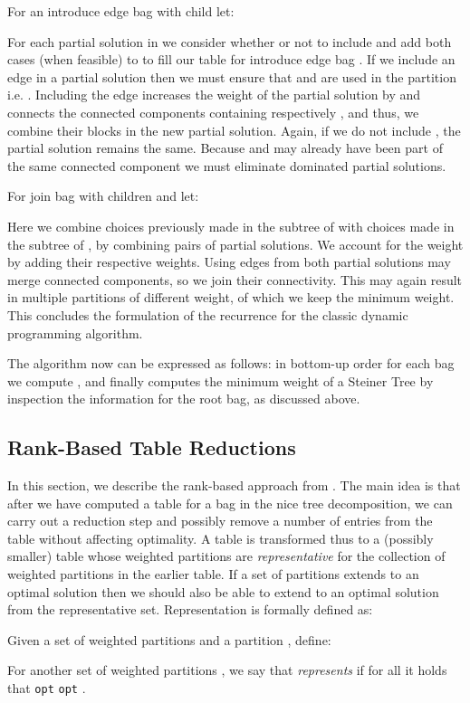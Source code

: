 \documentclass{llncs}
\begin{document}
 For an introduce edge  bag  with child  let:


For each partial solution in  we consider whether or not to include  and add both cases (when feasible) to  to fill our table for introduce edge bag . If we include an edge in a partial solution then we must ensure that  and  are used in the partition i.e. . Including the edge increases the weight of the partial solution by  and connects the connected components containing  respectively ,
and thus, we combine their blocks in the new partial solution. Again, if we do not include , the partial solution remains the same. Because  and  may already have been part of the same connected component we must eliminate dominated partial solutions.

For join bag  with children  and  let:


Here we combine choices previously made in the subtree of  with choices made in the subtree of , by combining pairs of partial solutions. We account for the weight by adding their respective weights. Using edges from both partial solutions may merge connected components, so we join their connectivity. This may again result in multiple partitions of different weight, of which
we keep the minimum weight. This concludes the formulation of the recurrence for the classic dynamic programming algorithm.

The algorithm now can be expressed as follows: in bottom-up order for each bag  we compute ,
and finally computes the minimum weight of a Steiner Tree by inspection the information for the root bag, as discussed above.

\subsection{Rank-Based Table Reductions}
In this section, we describe the rank-based approach from \cite{BodlaenderCKN12}. The main idea is that after we have computed a table for a bag in the nice tree
decomposition, we can carry out a reduction step and possibly remove a number of entries from the table without affecting optimality. 
A table is transformed thus to a (possibly smaller) table whose weighted partitions are {\em representative} for the collection of weighted partitions in the earlier table.
If a set of partitions extends to an optimal solution then we should also be able to extend to an optimal solution from the representative set. Representation is formally defined as:
\begin{definition}[Representation]
Given a set of weighted partitions  and a partition , define:

For another set of weighted partitions , we say that  \emph{represents}  if for all  it holds that \texttt{opt} \texttt{opt} .
\end{definition}
\end{document}

